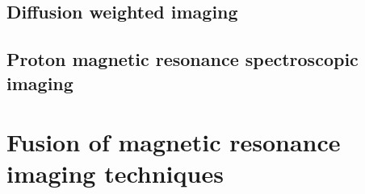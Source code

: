 \subsection{Diffusion weighted imaging}\label{subsection:stateart:dwi}


\subsection{Proton magnetic resonance spectroscopic imaging}\label{subsection:stateart:mrsi}


\section{Fusion of magnetic resonance imaging techniques}

